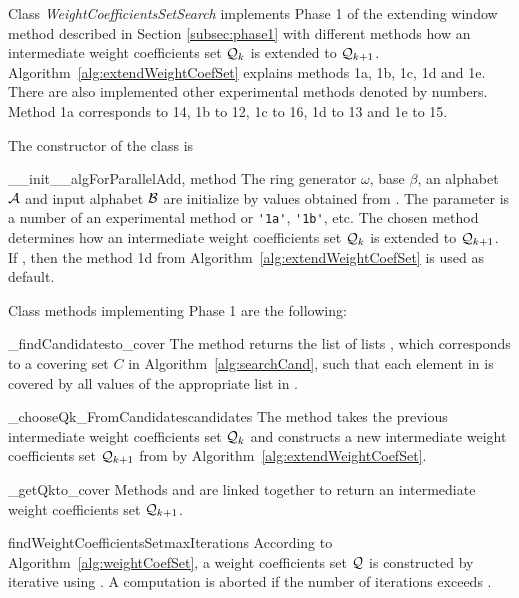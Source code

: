 Class \emph{WeightCoefficientsSetSearch} implements Phase 1 of the extending window method described in Section \ref{subsec:phase1} with different methods how an intermediate weight coefficients set $\mathcal{Q}_k$ is extended to $\mathcal{Q}_{k+1}$. Algorithm~\ref{alg:extendWeightCoefSet} explains methods 1a, 1b, 1c, 1d and 1e. There are also implemented other experimental methods denoted by numbers. Method 1a corresponds to 14, 1b to 12, 1c to 16, 1d to 13 and 1e to 15. 

The constructor of the class is 

\begin{method}{\_\_init\_\_}{algForParallelAdd, method}
The ring generator $\omega$, base $\beta$, an alphabet $\mathcal{A}$ and input alphabet $\mathcal{B}$ are initialize by values obtained from . The parameter  is a number of an experimental method or \verb+'1a'+, \verb+'1b'+, etc. The chosen method determines how an intermediate weight coefficients set $\mathcal{Q}_k$ is extended to $\mathcal{Q}_{k+1}$. If , then the method 1d from Algorithm~\ref{alg:extendWeightCoefSet} is used as default.
\end{method}

Class methods implementing Phase 1 are the following:

\begin{method}{\_findCandidates}{to\_cover}
 The method returns the list of lists , which corresponds to a covering set $C$ in Algorithm~\ref{alg:searchCand}, such that each element in  is covered by all values of the appropriate list in .  
\end{method}


\begin{method}{\_chooseQk\_FromCandidates}{candidates}
The method takes the previous intermediate weight coefficients set $\mathcal{Q}_{k}$ and constructs a new intermediate weight coefficients set $\mathcal{Q}_{k+1}$ from  by Algorithm~\ref{alg:extendWeightCoefSet}.
\end{method}


\begin{method}{\_getQk}{to\_cover}
Methods  and  are linked together to return an intermediate weight coefficients set $\mathcal{Q}_{k+1}$.
\end{method}

\begin{method}{findWeightCoefficientsSet}{maxIterations}
According to  Algorithm~\ref{alg:weightCoefSet}, a weight coefficients set $\mathcal{Q}$ is constructed by iterative using . A computation is aborted if the number of iterations exceeds . 
\end{method}

